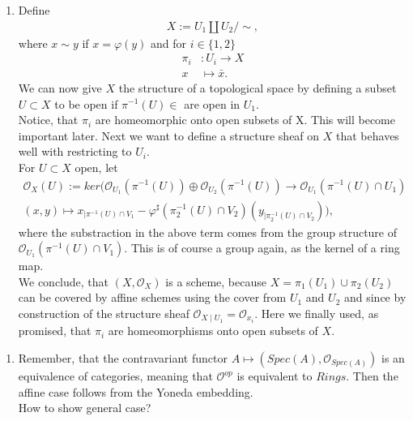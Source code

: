 \begin{exercise}{1}
    \begin{enumerate}
        \item Define 
        \begin{align*}
            X:=U_1\coprod U_2/\!{\sim},
        \end{align*}
        where $x\sim y$ if $x=\varphi(y)$ and for $i\in \lbrace
        1,2\rbrace$
        \begin{align*}
            \pi_i&:U_i\to X\\
            x&\mapsto \bar{x}.
        \end{align*}
        We can now give $X$ the structure of a topological 
        space by defining a subset $U\subset X$ to be open
        if $\pi^{-1}(U)\in$ are open in $U_1$.\\
        Notice, that $\pi_i$ are homeomorphic onto open subsets
        of X. This will become important later.
        Next we want to define a structure sheaf on $X$ that
        behaves well with restricting to $U_i.$\\
        For $U\subset X$ open, let 
        \begin{align*}
            \mathcal{O}_X(U):=ker(\mathcal{O}_{U_1}(\pi^{-1}(U))\oplus \mathcal{O}_{U_2}(\pi^{-1}(U)) \to \mathcal{O}_{U_1}(\pi^{-1}(U) \cap U_1)\\
            (x,y) \mapsto x_{\mid \pi^{-1}(U)\cap V_1}-\varphi^\sharp (\pi_2^{-1}(U)\cap V_2)(y_{\mid \pi_2^{-1}(U)\cap V_2})),
        \end{align*}
            where the substraction in the above term comes from the group
            structure of $\mathcal{O}_{U_1}(\pi^{-1}(U)\cap V_1)$. This is of course
            a group again, as the kernel of a ring map.\\
            We conclude, that $(X,\mathcal{O}_X)$ is a scheme, because 
            $X=\pi_1(U_1)\cup \pi _2(U_2)$  can be covered by affine
            schemes using the cover from $U_1$ and $U_2$ and since by construction
            of the structure sheaf $\mathcal{O}_{X \mid U_1}=\mathcal{O}_{x_i}.$
            Here we finally used, as promised, that $\pi_i$ are homeomorphisms
            onto open subsets of $X$.
    \end{enumerate}
\end{exercise}
\begin{exercise}{3}
    \begin{enumerate}
        \item Remember, that the 
        contravariant functor
         $A\mapsto (Spec(A),\mathcal{O}_{Spec(A)})$
         is an equivalence of categories, meaning that 
         $\mathcal{O}^{op}$ is equivalent to $Rings$. Then
         the affine case follows from the Yoneda embedding.\\
         How to show general case?
    \end{enumerate}
\end{exercise}

